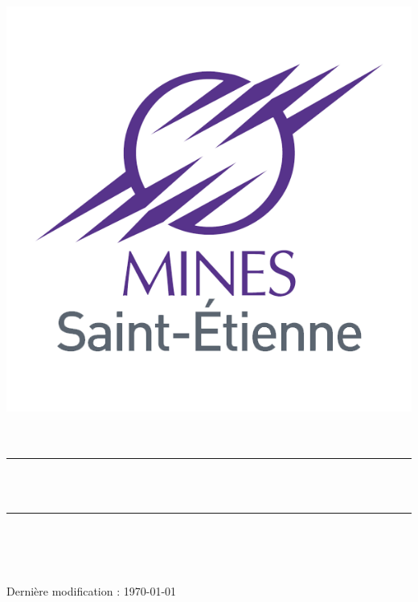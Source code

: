 \begin{center}
    \includegraphics[scale=0.3]{img/emse-logo.png}~\\[1.5cm]
    
    \textsc{
        \Large \thediscipline
    } \\
    [1.5cm]
    
    \rule{\linewidth}{0.5mm}
    \\ [0.4cm]
    { \huge \bfseries \thetitle \\[0.4cm] }
    \rule{\linewidth}{0.5mm}
    \\ [2cm]
    
    \large
    	\theauthor \\
        \thepromotion

    \vfill
    
    \large \thedate \\
	\small Dernière modification : \today
\end{center}

\newpage
